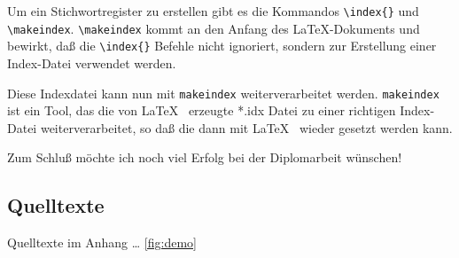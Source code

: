 \documentclass[%
	12pt,		%
	headinclude,	%
	a4paper,	%
	pointlessnumbers, %
	changebar,      %
	liststotoc,	%
	bibtotoc,
	idxtotoc,
	]{diplomarbeit}
\begin{document}
Um ein Stichwortregister zu erstellen gibt es die Kommandos
 \verb#\index{}# und \verb#\makeindex#.  
\verb#\makeindex# kommt an den Anfang des \LaTeX -Dokuments und bewirkt,
daß die \verb#\index{}# Befehle nicht ignoriert, sondern zur Erstellung
einer Index-Datei verwendet werden.

Diese Indexdatei kann nun mit {\tt makeindex} weiterverarbeitet werden.
{\tt makeindex} ist ein Tool, das die von \LaTeX ~ erzeugte *.idx Datei
zu einer richtigen Index-Datei weiterverarbeitet, so daß die dann mit
\LaTeX ~ wieder gesetzt werden kann.

Zum Schluß möchte ich noch viel Erfolg bei der Diplomarbeit wünschen!


\clearpage
\begin{appendix}

%

\chapter{Quelltexte}
Quelltexte im Anhang \dots
\ref{fig:demo}

%
\end{appendix}

\clearpage
\printindex

%
\clearpage
%


\end{document}

